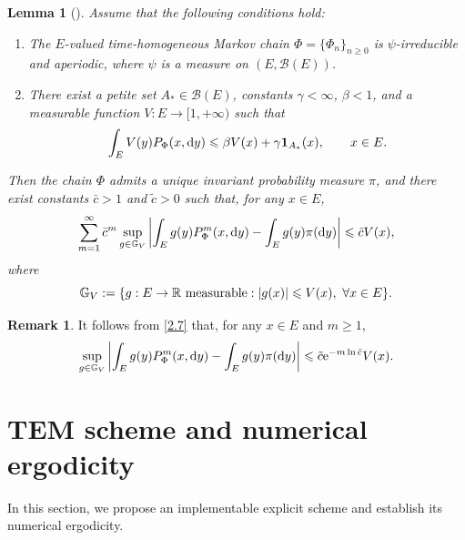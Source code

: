 \documentclass[aap]{imsart}
\theoremstyle{plain}
\newtheorem{lemma}[theorem]{Lemma}
\theoremstyle{definition}
\newtheorem{remark}{Remark}
\begin{document}
\begin{lemma}[{\cite[Theorem 15.0.1]{Meyn}}]\label{GET}
	Assume that the following conditions hold:
	\begin{enumerate}
		\item[(i)] The \(E\)-valued time-homogeneous Markov chain
		\(\Phi=\{\Phi_n\}_{n\geqslant0}\) is \(\psi\)-irreducible and aperiodic, where \(\psi\) is a measure on \((E,\mathcal{B}(E))\).
		
		\item[(ii)] There exist a petite set \(A_*\in\mathcal{B}(E)\), constants
		\(\gamma<\infty\), \(\beta<1\), and a measurable function
		\(V:E\to[1,+\infty)\) such that
		\[
		\int_E V(y)P_{\Phi}(x,\mathrm{d} y)
		\leqslant \beta V(x)+\gamma \mathbf{1}_{A_*}(x),
		\qquad x\in E.
		\]
	\end{enumerate}
	Then the chain \(\Phi\) admits a unique invariant probability measure \(\pi\), and there exist constants \(\bar{c}>1\) and \(\tilde{c}>0\) such that, for any \(x\in E\),
	\begin{equation}\label{2.7}
		\sum_{m=1}^{\infty}\bar{c}^m
		\sup_{g\in\mathbb{G}_V}
		\left|
		\int_E g(y)P^m_{\Phi}(x,\mathrm{d} y)
		-
		\int_E g(y)\pi(\mathrm{d} y)
		\right|
		\leqslant \tilde{c}V(x),
	\end{equation}
	where
	\[
	\mathbb{G}_V
	:=
	\{g:E\to\mathbb{R} \text{ measurable}: |g(x)|\leqslant V(x),\ \forall x\in E\}.
	\]
\end{lemma}	
\begin{remark}\label{RE1}
	It follows from \eqref{2.7} that, for any \(x\in E\) and \(m\geqslant1\),
	\[
	\sup_{g\in\mathbb{G}_V}
	\left|
	\int_E g(y)P^m_{\Phi}(x,\mathrm{d} y)
	-
	\int_E g(y)\pi(\mathrm{d} y)
	\right|
	\leqslant
	\tilde{c}\mathrm{e}^{-m\ln\bar{c}}V(x).
	\]
\end{remark}
\section{TEM scheme and numerical ergodicity}
In this section, we propose an implementable explicit scheme and establish its numerical ergodicity.
\end{document}
